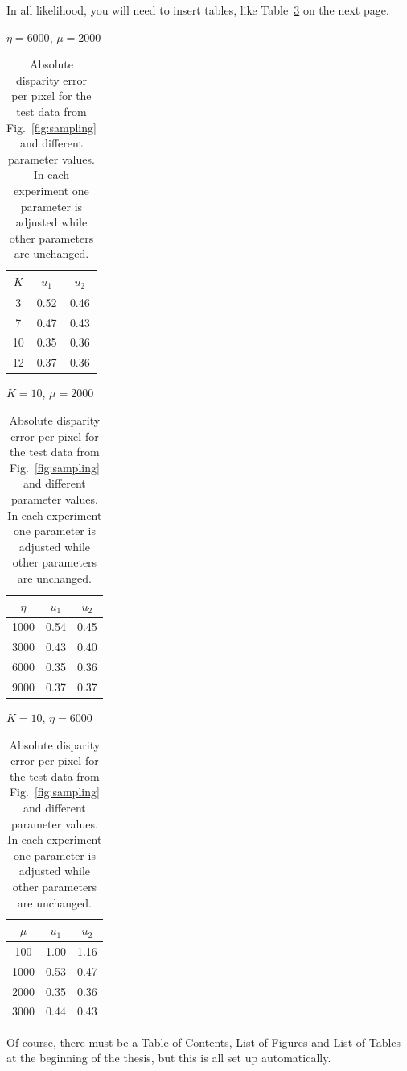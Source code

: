 In all likelihood, you will need to insert tables, like Table~\ref{tbl:parameters} on the next page.
\clearpage

\begin{table}[h]
	\caption{Absolute disparity error per pixel for the test data from
		Fig.~\ref{fig:sampling} and different parameter values. In each experiment one
		parameter is adjusted while other parameters are unchanged.} 
	\centering
	\renewcommand{\arraystretch}{1.2}
	\begin{minipage}[b]{0.30\linewidth}
		\centerline{$\eta=6000$, $\mu=2000$}\smallskip
		\centering
		\begin{tabular}{ccc}
			\hline
			$K$ & $u_1$ & $u_2$\\
			\hline
			3   & 0.52 &0.46\\
			7   & 0.47 &0.43\\
			10  & 0.35 &0.36\\
			12  & 0.37 &0.36\\
			\hline
		\end{tabular}
	\end{minipage}
	\begin{minipage}[b]{0.34\linewidth}
		\centerline{$K=10$, $\mu=2000$}\smallskip
		\centering
		\begin{tabular}{ccc}
			\hline
			$\eta$ & $u_1$ & $u_2$\\
			\hline
			1000&0.54& 0.45\\
			3000&0.43& 0.40\\
			6000&0.35& 0.36\\
			9000&0.37& 0.37\\
			\hline
		\end{tabular}
	\end{minipage}
	\begin{minipage}[b]{0.32\linewidth}
		\centerline{$K=10$, $\eta=6000$}\smallskip
		\centering
		\begin{tabular}{ccc}
			\hline
			$\mu$ & $u_1$ & $u_2$\\
			\hline
			100 &1.00&1.16\\
			1000&0.53&0.47\\
			2000&0.35&0.36\\
			3000&0.44&0.43\\
			\hline
		\end{tabular}
	\end{minipage}
	\label{tbl:parameters}
\end{table}

Of course, there must be a Table of Contents, List of Figures and List of Tables at the beginning of the thesis, but this is all set up automatically.

